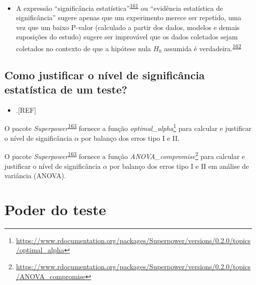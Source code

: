 \documentclass[
  a4paper,
]{book}
\providecommand{\tightlist}{%
  \setlength{\itemsep}{0pt}\setlength{\parskip}{0pt}}
\renewcommand{\href}[2]{#2\footnote{\url{#1}}}
\newenvironment{infobox}[1]
  {
  \begin{itemize}
  \renewcommand{\labelitemi}{
    \raisebox{-.7\height}[0pt][0pt]{
      {\setkeys{Gin}{width=3em,keepaspectratio}
        \texttt{[image: \#1]}}
    }
  }
  \setlength{\fboxsep}{1em}
  \begin{blackbox}
  \item
  }
  {
  \end{blackbox}
  \end{itemize}
  }
\begin{document}
\begin{itemize}
\tightlist
\item
  A expressão ``significância estatística''\textsuperscript{\protect\hyperlink{ref-latter1902}{161}} ou ``evidência estatística de significância'' sugere apenas que um experimento merece ser repetido, uma vez que um baixo P-valor (calculado a partir dos dados, modelos e demais suposições do estudo) sugere ser improvável que os dados coletados sejam coletados no contexto de que a hipótese nula \(H_{0}\) assumida é verdadeira.\textsuperscript{\protect\hyperlink{ref-aylmerfisher1926}{162}}
\end{itemize}

\hypertarget{como-justificar-o-nuxedvel-de-significuxe2ncia-estatuxedstica-de-um-teste}{%
\subsection{Como justificar o nível de significância estatística de um teste?}\label{como-justificar-o-nuxedvel-de-significuxe2ncia-estatuxedstica-de-um-teste}}

\begin{itemize}
\tightlist
\item
  .{[}REF{]}
\end{itemize}

\begin{infobox}{images/Rlogo}
O pacote \emph{Superpower}\textsuperscript{\protect\hyperlink{ref-Superpower}{163}} fornece a função \href{https://www.rdocumentation.org/packages/Superpower/versions/0.2.0/topics/optimal_alpha}{\emph{optimal\_alpha}} para calcular e justificar o nível de significância \(\alpha\) por balanço dos erros tipo I e II.

\end{infobox}

\begin{infobox}{images/Rlogo}
O pacote \emph{Superpower}\textsuperscript{\protect\hyperlink{ref-Superpower}{163}} fornece a função \href{https://www.rdocumentation.org/packages/Superpower/versions/0.2.0/topics/ANOVA_compromise}{\emph{ANOVA\_compromise}} para calcular e justificar o nível de significância \(\alpha\) por balanço dos erros tipo I e II em análise de variância (ANOVA).

\end{infobox}

\hypertarget{poder-teste}{%
\section{Poder do teste}\label{poder-teste}}
\end{document}
